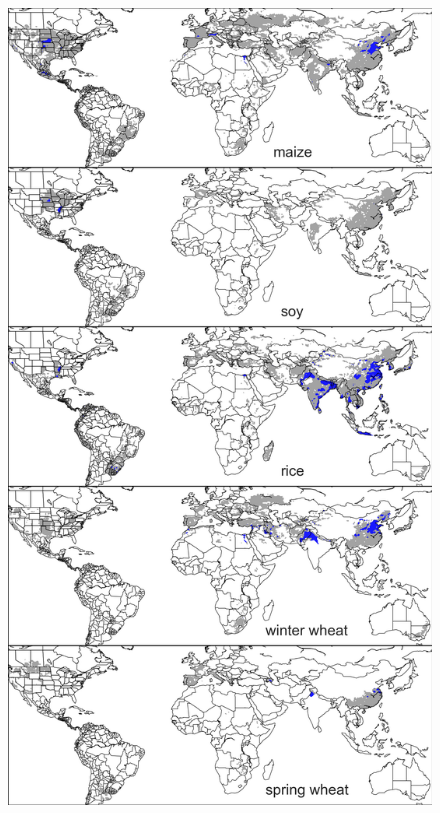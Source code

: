\documentclass[10pt]{article}
\begin{document}

\clearpage
\modulolinenumbers[2]
\linenumbers

\renewcommand{\thefigure}{S\arabic{figure}}

\begin{figure}[h!]
\centering
\begin{minipage}{.45\textwidth}
    \centering
    \vspace{0pt}
    \includegraphics[width=\textwidth]{s_croparea_irr.png}\\

\end{minipage}
\end{figure}
\end{document}
